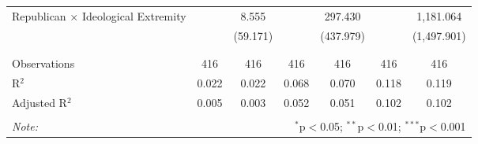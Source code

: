 \begin{tabular}{@{\extracolsep{5pt}}lcccccc}
 Republican $\times$ Ideological Extremity &  & 8.555 &  & 297.430 &  & 1,181.064 \\ 
  &  & (59.171) &  & (437.979) &  & (1,497.901) \\ 
  & & & & & & \\ 
\hline \\[-1.8ex] 
Observations & 416 & 416 & 416 & 416 & 416 & 416 \\ 
R$^{2}$ & 0.022 & 0.022 & 0.068 & 0.070 & 0.118 & 0.119 \\ 
Adjusted R$^{2}$ & 0.005 & 0.003 & 0.052 & 0.051 & 0.102 & 0.102 \\ 
\hline 
\hline \\[-1.8ex] 
\textit{Note:}  & \multicolumn{6}{r}{$^{*}$p$<$0.05; $^{**}$p$<$0.01; $^{***}$p$<$0.001} \\ 
\end{tabular} 
